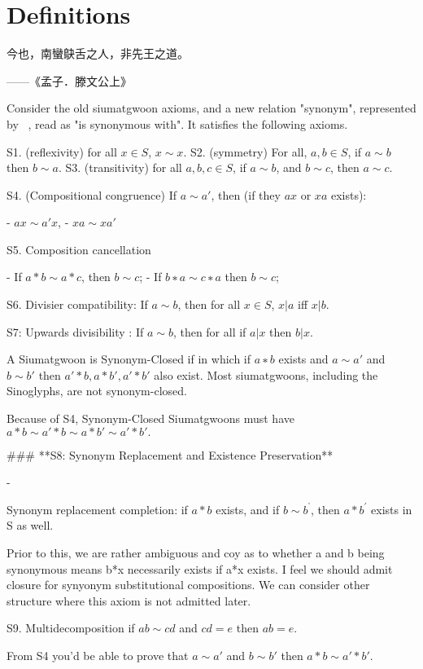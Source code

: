 \chapter{Definitions}

\epigraph{今也，南蠻鴃舌之人，非先王之道。}{——《孟子．滕文公上》}

Consider the old siumatgwoon axioms, and a new relation "synonym", represented by ~, read as "is synonymous with". It satisfies the following axioms.

S1. (reflexivity) for all $x\in S$, $x\sim x$.
S2. (symmetry) For all, $a,b\in S$, if $a\sim b$ then $b\sim a$.
S3. (transitivity) for all $a,b,c \in S$, if $a\sim b$, and $b \sim c$, then $a \sim c$.

S4. (Compositional congruence) If $a \sim a'$, then (if they $ax$ or $xa$ exists):

- $ax \sim a'x$,
- $xa \sim xa'$

S5. Composition cancellation

- If $a * b \sim a * c$, then $b \sim c$;
- If $b∗a\sim c∗a$ then  $b \sim c$;

S6. Divisier compatibility: If $a \sim b$, then for all $x \in S$, $x|a$ iff $x|b$.

S7: Upwards divisibility : If $a∼b$, then for all if $a|x$ then $b|x$.

A Siumatgwoon is Synonym-Closed if in which if $a∗b$  exists and $a∼a'$ and $b∼b'$ then $a'*b, a*b', a'*b'$ also exist. Most siumatgwoons, including the Sinoglyphs, are not synonym-closed. 

Because of S4, Synonym-Closed Siumatgwoons must have $a*b \sim a'*b \sim  a*b'\sim  a'*b'.$ 

### **S8: Synonym Replacement and Existence Preservation**

- 

Synonym replacement completion: if $a*b$ exists, and if $b\sim b^{’}$, then $a*b^{'}$ exists in S as well.

Prior to this, we are rather ambiguous and coy as to whether a and b being synonymous means b*x necessarily exists if a*x exists. I feel we should admit closure for synyonym substitutional compositions. We can consider other structure where this axiom is not admitted later.

S9. Multidecomposition if $ab \sim cd$ and $cd = e$ then $ab =e$. 

From S4 you’d be able to prove that $a \sim a'$ and $b\sim b'$ then $a * b \sim a' * b'$.

